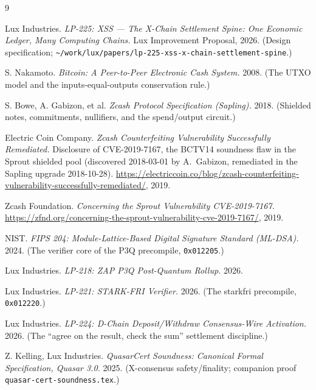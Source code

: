 \documentclass[11pt]{article}
\theoremstyle{definition}
\theoremstyle{remark}
\begin{document}
\begin{thebibliography}{9}

Lux Industries.
\emph{LP-225: XSS --- The X-Chain Settlement Spine: One Economic Ledger,
Many Computing Chains.} Lux Improvement Proposal, 2026.
(Design specification; \texttt{\textasciitilde/work/lux/papers/lp-225-xss-x-chain-settlement-spine}.)

S. Nakamoto.
\emph{Bitcoin: A Peer-to-Peer Electronic Cash System.} 2008.
(The UTXO model and the inputs-equal-outputs conservation rule.)

S. Bowe, A. Gabizon, et al.
\emph{Zcash Protocol Specification (Sapling).} 2018.
(Shielded notes, commitments, nullifiers, and the spend/output circuit.)

Electric Coin Company.
\emph{Zcash Counterfeiting Vulnerability Successfully Remediated.}
Disclosure of CVE-2019-7167, the BCTV14 soundness flaw in the Sprout
shielded pool (discovered 2018-03-01 by A.\ Gabizon, remediated in the
Sapling upgrade 2018-10-28).
\url{https://electriccoin.co/blog/zcash-counterfeiting-vulnerability-successfully-remediated/}, 2019.

Zcash Foundation.
\emph{Concerning the Sprout Vulnerability CVE-2019-7167.}
\url{https://zfnd.org/concerning-the-sprout-vulnerability-cve-2019-7167/}, 2019.

NIST.
\emph{FIPS 204: Module-Lattice-Based Digital Signature Standard (ML-DSA).}
2024. (The verifier core of the P3Q precompile, \texttt{0x012205}.)

Lux Industries.
\emph{LP-218: ZAP P3Q Post-Quantum Rollup.} 2026.

Lux Industries.
\emph{LP-221: STARK-FRI Verifier.} 2026.
(The starkfri precompile, \texttt{0x012220}.)

Lux Industries.
\emph{LP-224: D-Chain Deposit/Withdraw Consensus-Wire Activation.} 2026.
(The ``agree on the result, check the sum'' settlement discipline.)

Z. Kelling, Lux Industries.
\emph{QuasarCert Soundness: Canonical Formal Specification, Quasar 3.0.}
2025. (X-consensus safety/finality; companion proof
\texttt{quasar-cert-soundness.tex}.)

\end{thebibliography}
\end{document}
